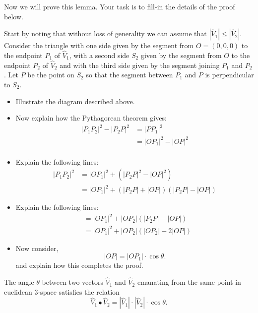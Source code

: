 \documentclass{ximera}
\begin{document}
Now we will prove this lemma. Your task is to fill-in the details of
the proof below.

\begin{problem}
Start by noting that without loss of generality we can assume that
$\left\vert \hat{V} _{1}\right\vert \le\left\vert
\hat{V}_{2}\right\vert$. Consider the triangle with one side given by
the segment from $O=\left( 0,0,0\right) $ to the endpoint $P_{1}$ of
$\hat{V}_{1}$, with a second side $S_{2}$ given by the segment from
$O$ to the endpoint $P_{2}$ of $\hat{V}_{2}$ and with the third side
given by the segment joining $P_{1}$ and $P_{2}$. Let $P$ be the
point on $S_{2}$ so that the segment between $P_{1}$ and $P$ is
perpendicular to $S_{2}$.
\begin{itemize}
\item Illustrate the diagram described above. 
\item Now explain how the Pythagorean theorem gives:
\begin{align*}
|P_{1}P_{2}|^{2} - |P_{2}P|^{2} &= |PP_{1}|^{2}\\
&= |OP_{1}|^{2} - |OP|^{2}\\
\end{align*}
\item Explain the following lines:
\begin{align*}
|P_{1}P_{2}|^{2} &= |OP_{1}|^{2}+\left(|P_{2}P|^{2}-|OP|^{2}\right) \\
&=|OP_{1}|^{2}+\left(|P_{2}P|+|OP|\right)\left(|P_{2}P|-|OP| \right)
\end{align*}
\item Explain the following lines:
\begin{align*}
&=|OP_{1}|^{2}+|OP_{2}| \left(|P_{2}P|-|OP|\right)\\
&=|OP_{1}|^{2}+|OP_{2}| \left(|OP_{2}| -2| OP| \right)
\end{align*}
\item Now consider,
\[
|OP| =|OP_{1}| \cdot\cos\theta.
\]
and explain how this completes the proof.
\end{itemize}
\end{problem}




\begin{theorem}
\label{111}The angle $\theta$ between two vectors $\hat{V}_{1}$ and
$\hat{V}_{2}$ emanating from the same point in euclidean $3$-space satisfies
the relation
\begin{equation}
\hat{V}_{1}\bullet\hat{V}_{2}=\left\vert \hat{V}_{1}\right\vert \cdot
\left\vert \hat{V}_{2}\right\vert \cdot\cos\theta. \label{2}%
\end{equation}
\end{theorem}
\end{document}
